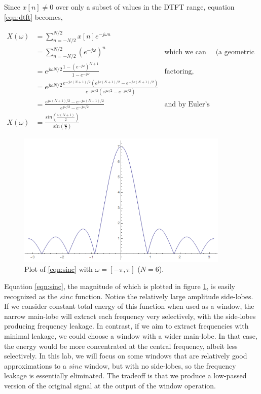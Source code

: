 \documentclass[11pt,a4paper]{article}
\begin{document}
Since $x[n]\neq 0$ over only a subset of values in the DTFT range, equation \eqref{eqn:dtft} becomes,

\begin{align}
X(\omega) &= \sum_{n=-N/2}^{N/2} x[n]e^{-j\omega n}  \nonumber \\
		  &= \sum_{n=-N/2}^{N/2} \left(e^{-j\omega}\right)^n &\text{which we can rewrite as} &\text{(a geometric series)} \nonumber \\
		  &= e^{j\omega N/2} \frac{1-\left(e^{-j\omega}\right)^{N+1}}{1-e^{-j\omega}} &\text{factoring,} \nonumber \\
		  &= e^{j\omega N/2} \frac{e^{-j\omega (N+1)/2} \left( e^{j\omega (N+1)/2} - e^{-j\omega (N+1)/2} \right)}{e^{-j\omega/2} \left( e^{j\omega/2} - e^{-j\omega/2} \right)} \nonumber \\
		  &= \frac{e^{j\omega (N+1)/2} - e^{-j\omega (N+1)/2}}{e^{j\omega/2} - e^{-j\omega/2}} &\text{and by Euler's formula,} \nonumber \\
X(\omega) &= \frac{sin(\frac{\omega(N+1)}{2})}{sin(\frac{\omega}{2})} \label{eqn:sinc}
\end{align}

\pagebreak

\begin{figure}
	\centering
	\includegraphics[width=0.9\textwidth]{sinc}
	\caption{Plot of \eqref{eqn:sinc} with $\omega=[-\pi,\pi]$ ($N=6$).}
	\label{fig:sinc}
\end{figure}

Equation \eqref{eqn:sinc}, the magnitude of which is plotted in figure \ref{fig:sinc}, is easily recognized as the $sinc$ function. Notice the relatively large amplitude side-lobes. If we consider constant total energy of this function when used as a window, the narrow main-lobe will extract each frequency very selectively, with the side-lobes producing frequency leakage. In contrast, if we aim to extract frequencies with minimal leakage, we could choose a window with a wider main-lobe. In that case, the energy would be more concentrated at the central frequency, albeit less selectively. In this lab, we will focus on some windows that are relatively good approximations to a $sinc$ window, but with no side-lobes, so the frequency leakage is essentially eliminated. The tradeoff is that we produce a low-passed version of the original signal at the output of the window operation. 
\end{document}
